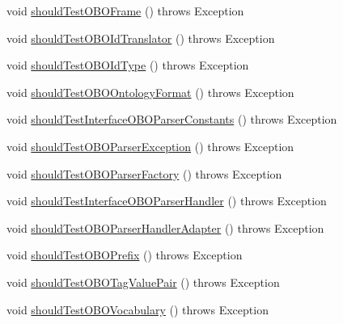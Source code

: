 \begin{DoxyCompactItemize}
void \hyperlink{classorg_1_1semanticweb_1_1owlapi_1_1contract_1_1_contract_obo_parser_test_a586033e1aed3d617423f3978db685121}{should\-Test\-O\-B\-O\-Frame} ()  throws Exception 
\item 
void \hyperlink{classorg_1_1semanticweb_1_1owlapi_1_1contract_1_1_contract_obo_parser_test_a4b53afa37dd444a69bd02ec453283bbf}{should\-Test\-O\-B\-O\-Id\-Translator} ()  throws Exception 
\item 
void \hyperlink{classorg_1_1semanticweb_1_1owlapi_1_1contract_1_1_contract_obo_parser_test_a1a25563e96923db1f9ea2e07b43f9f54}{should\-Test\-O\-B\-O\-Id\-Type} ()  throws Exception 
\item 
void \hyperlink{classorg_1_1semanticweb_1_1owlapi_1_1contract_1_1_contract_obo_parser_test_a91f8f1e749078142c112d1e21cc85ef2}{should\-Test\-O\-B\-O\-Ontology\-Format} ()  throws Exception 
\item 
void \hyperlink{classorg_1_1semanticweb_1_1owlapi_1_1contract_1_1_contract_obo_parser_test_abc402da66a06173da55ce83c85d00bc2}{should\-Test\-Interface\-O\-B\-O\-Parser\-Constants} ()  throws Exception 
\item 
void \hyperlink{classorg_1_1semanticweb_1_1owlapi_1_1contract_1_1_contract_obo_parser_test_a90bff8c03414b206b163f2bbf994457f}{should\-Test\-O\-B\-O\-Parser\-Exception} ()  throws Exception 
\item 
void \hyperlink{classorg_1_1semanticweb_1_1owlapi_1_1contract_1_1_contract_obo_parser_test_a9c092375fcbd928a56259ad18536a99b}{should\-Test\-O\-B\-O\-Parser\-Factory} ()  throws Exception 
\item 
void \hyperlink{classorg_1_1semanticweb_1_1owlapi_1_1contract_1_1_contract_obo_parser_test_ab0155a6b774dc024ee17a49d63784311}{should\-Test\-Interface\-O\-B\-O\-Parser\-Handler} ()  throws Exception 
\item 
void \hyperlink{classorg_1_1semanticweb_1_1owlapi_1_1contract_1_1_contract_obo_parser_test_aa92d790305ee8e44b5a15b7d88ed3c71}{should\-Test\-O\-B\-O\-Parser\-Handler\-Adapter} ()  throws Exception 
\item 
void \hyperlink{classorg_1_1semanticweb_1_1owlapi_1_1contract_1_1_contract_obo_parser_test_a6effed969d78144edaace33cf2c9e84c}{should\-Test\-O\-B\-O\-Prefix} ()  throws Exception 
\item 
void \hyperlink{classorg_1_1semanticweb_1_1owlapi_1_1contract_1_1_contract_obo_parser_test_a9dc5ce19d55f57f5ef7eef38edd53367}{should\-Test\-O\-B\-O\-Tag\-Value\-Pair} ()  throws Exception 
\item 
void \hyperlink{classorg_1_1semanticweb_1_1owlapi_1_1contract_1_1_contract_obo_parser_test_a870d5c6b78b9b8321c45b8d37832c3a8}{should\-Test\-O\-B\-O\-Vocabulary} ()  throws Exception 

\end{DoxyCompactItemize}
